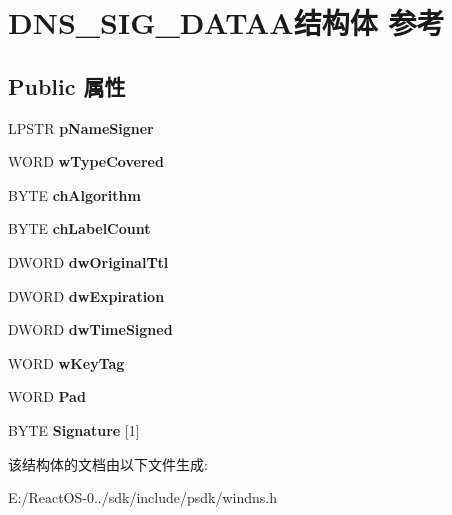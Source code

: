 \hypertarget{struct_d_n_s___s_i_g___d_a_t_a_a}{}\section{D\+N\+S\+\_\+\+S\+I\+G\+\_\+\+D\+A\+T\+A\+A结构体 参考}
\label{struct_d_n_s___s_i_g___d_a_t_a_a}
\subsection*{Public 属性}
\begin{DoxyCompactItemize}
\item 
\mbox{\label{struct_d_n_s___s_i_g___d_a_t_a_a_a3f52a9eaf37d0998fd9b7825bb88fa5a}} 
L\+P\+S\+TR {\bfseries p\+Name\+Signer}
\item 
\mbox{\label{struct_d_n_s___s_i_g___d_a_t_a_a_a678a07abab76fc36f7ea0965a92b397b}} 
W\+O\+RD {\bfseries w\+Type\+Covered}
\item 
\mbox{\label{struct_d_n_s___s_i_g___d_a_t_a_a_a2283d365f6db239b3d1407b5c185ce00}} 
B\+Y\+TE {\bfseries ch\+Algorithm}
\item 
\mbox{\label{struct_d_n_s___s_i_g___d_a_t_a_a_a5a62389a6272e28a14ae78d3932fd684}} 
B\+Y\+TE {\bfseries ch\+Label\+Count}
\item 
\mbox{\label{struct_d_n_s___s_i_g___d_a_t_a_a_adf12eee0e5a96122f22b1dbb99047b6d}} 
D\+W\+O\+RD {\bfseries dw\+Original\+Ttl}
\item 
\mbox{\label{struct_d_n_s___s_i_g___d_a_t_a_a_aed25d098760d7645da7a2a763e0a7a7c}} 
D\+W\+O\+RD {\bfseries dw\+Expiration}
\item 
\mbox{\label{struct_d_n_s___s_i_g___d_a_t_a_a_ad7913bd759d55a3e0af3f4e35b1ab4e0}} 
D\+W\+O\+RD {\bfseries dw\+Time\+Signed}
\item 
\mbox{\label{struct_d_n_s___s_i_g___d_a_t_a_a_a31f7d20a1e28a4cd929e7fc3723a7433}} 
W\+O\+RD {\bfseries w\+Key\+Tag}
\item 
\mbox{\label{struct_d_n_s___s_i_g___d_a_t_a_a_a8533e0cb7adbb74ddc68f1c5eef9a77b}} 
W\+O\+RD {\bfseries Pad}
\item 
\mbox{\label{struct_d_n_s___s_i_g___d_a_t_a_a_a0144fee286f1ddc092f069aef8f07847}} 
B\+Y\+TE {\bfseries Signature} \mbox{[}1\mbox{]}
\end{DoxyCompactItemize}


该结构体的文档由以下文件生成\+:\begin{DoxyCompactItemize}
\item 
E\+:/\+React\+O\+S-\/0../sdk/include/psdk/windns.\+h\end{DoxyCompactItemize}
